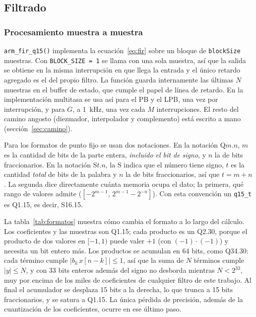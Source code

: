\documentclass[11pt,a4paper]{article}
\begin{document}
\subsection{Filtrado}

\subsubsection{Procesamiento muestra a muestra}

\texttt{arm\_fir\_q15()} implementa la ecuación~\eqref{eq:fir} sobre un
bloque de \texttt{blockSize} muestras. Con \texttt{BLOCK\_SIZE = 1} se llama
con una sola muestra, así que la salida se obtiene en la misma interrupción
en que llega la entrada y el único retardo agregado es el del propio filtro.
La función guarda internamente las últimas $N$ muestras en el buffer de
estado, que cumple el papel de línea de retardo. En la implementación
multitasa se usa así para el PB y el LPB, una vez por interrupción, y para
$G$, a \qty{1}{\kilo\hertz}, una vez cada $M$ interrupciones. El resto del
camino angosto (diezmador, interpolador y complemento) está escrito a mano
(sección~\ref{sec:camino}).

Para los formatos de punto fijo se usan dos notaciones. En la notación
Q$m$.$n$, $m$ es la cantidad de bits de la parte entera, \emph{incluido el
bit de signo}, y $n$ la de bits fraccionarios. En la notación S$t$.$n$, la S
indica que el número tiene signo, $t$ es la cantidad \emph{total} de bits de
la palabra y $n$ la de bits fraccionarios, así que $t = m + n$. La segunda
dice directamente cuánta memoria ocupa el dato; la primera, qué rango de
valores admite ($[-2^{m-1},\, 2^{m-1} - 2^{-n}]$). Con esta convención un
\texttt{q15\_t} es Q1.15, es decir, S16.15.

La tabla~\ref{tab:formatos} muestra cómo cambia el formato a lo largo del
cálculo. Los coeficientes y las muestras son Q1.15; cada producto es un
Q2.30, porque el producto de dos valores en $[-1, 1)$ puede valer $+1$ (con
$(-1)\cdot(-1)$) y necesita un bit entero más. Los productos se acumulan en
64 bits, como Q34.30: cada término cumple $|b_k\,x[n-k]| \le 1$, así que la
suma de $N$ términos cumple $|y| \le N$, y con 33 bits enteros además del
signo no desborda mientras $N < 2^{33}$, muy por encima de los miles de
coeficientes de cualquier filtro de este trabajo. Al final el acumulador se
desplaza 15 bits a la derecha, lo que trunca a 15 bits fraccionarios, y se
satura a Q1.15. La única pérdida de precisión, además de la cuantización de
los coeficientes, ocurre en ese último paso.
\end{document}
